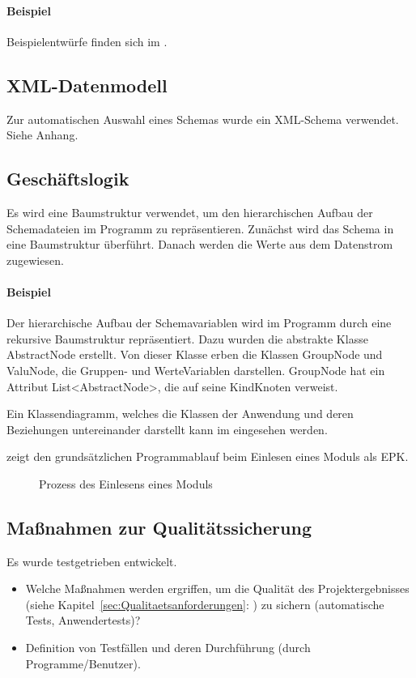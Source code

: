 \paragraph{Beispiel}
Beispielentwürfe finden sich im .


\subsection{XML-Datenmodell}
Zur automatischen Auswahl eines Schemas wurde ein XML-Schema verwendet. Siehe Anhang.

\subsection{Geschäftslogik}
\label{sec:Geschaeftslogik}
Es wird eine Baumstruktur verwendet, um den hierarchischen Aufbau der Schemadateien im Programm zu repräsentieren.
Zunächst wird das Schema in eine Baumstruktur überführt.
Danach werden die Werte aus dem Datenstrom zugewiesen.



\paragraph{Beispiel}
Der hierarchische Aufbau der Schemavariablen wird im Programm durch eine rekursive Baumstruktur repräsentiert. Dazu wurden die abstrakte Klasse AbstractNode erstellt. Von dieser Klasse erben die Klassen GroupNode und ValuNode, die Gruppen- und WerteVariablen darstellen. GroupNode hat ein Attribut List<AbstractNode>, die auf seine KindKnoten verweist. 

Ein Klassendiagramm, welches die Klassen der Anwendung und deren Beziehungen untereinander darstellt kann im  eingesehen werden.

 zeigt den grundsätzlichen Programmablauf beim Einlesen eines Moduls als \ac{EPK}.
\begin{figure}[htb]
\centering
{}
\caption{Prozess des Einlesens eines Moduls}
\label{fig:Modulimport}
\end{figure}


\subsection{Maßnahmen zur Qualitätssicherung}
\label{sec:Qualitaetssicherung}
Es wurde testgetrieben entwickelt.
\begin{itemize}
	\item Welche Maßnahmen werden ergriffen, um die Qualität des Projektergebnisses (siehe Kapitel~\ref{sec:Qualitaetsanforderungen}: ) zu sichern (\zB automatische Tests, Anwendertests)?
	\item \Ggfs Definition von Testfällen und deren Durchführung (durch Programme/Benutzer).
\end{itemize}


